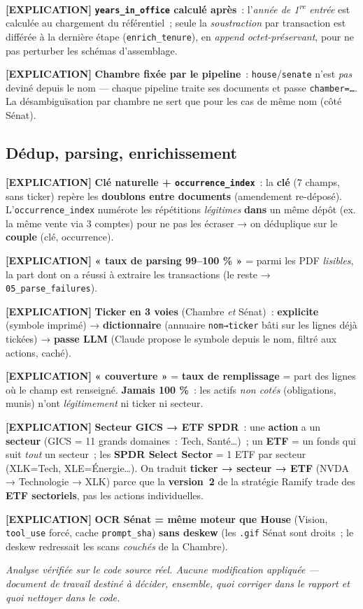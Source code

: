 \documentclass[11pt,a4paper]{article}
\newcommand{\co}[1]{\texttt{\small #1}}
\newcommand{\tagExp}{\textcolor{green!50!black}{\textbf{[EXPLICATION]}}}
\begin{document}
\tagExp{} \textbf{\co{years_in_office} calculé après}~: l'\emph{année de 1\textsuperscript{re} entrée}
est calculée au chargement du référentiel~; seule la \emph{soustraction} par transaction est différée à
la dernière étape (\co{enrich_tenure}), en \emph{append octet-préservant}, pour ne pas perturber les
schémas d'assemblage.

\tagExp{} \textbf{Chambre fixée par le pipeline}~: \co{house}/\co{senate} n'est \emph{pas} deviné depuis
le nom — chaque pipeline traite ses documents et passe \co{chamber=…}. La désambiguïsation par chambre
ne sert que pour les cas de même nom (côté Sénat).

\subsection{Dédup, parsing, enrichissement}
\tagExp{} \textbf{Clé naturelle + \co{occurrence_index}}~: la \textbf{clé} (7 champs, sans ticker) repère
les \textbf{doublons entre documents} (amendement re-déposé). L'\co{occurrence_index} numérote les
répétitions \emph{légitimes} \textbf{dans} un même dépôt (ex. la même vente via 3 comptes) pour ne pas
les écraser → on déduplique sur le \textbf{couple} (clé, occurrence).

\tagExp{} \textbf{« taux de parsing 99–100 \% »} = parmi les PDF \emph{lisibles}, la part dont on a
réussi à extraire les transactions (le reste → \co{05_parse_failures}).

\tagExp{} \textbf{Ticker en 3 voies} (Chambre \emph{et} Sénat)~: \textbf{explicite} (symbole imprimé) →
\textbf{dictionnaire} (annuaire \co{nom→ticker} bâti sur les lignes déjà tickées) → \textbf{passe LLM}
(Claude propose le symbole depuis le nom, filtré aux actions, caché).

\tagExp{} \textbf{« couverture »} = \textbf{taux de remplissage} = part des lignes où le champ est
renseigné. \textbf{Jamais 100 \%}~: les actifs \emph{non cotés} (obligations, munis) n'ont
\emph{légitimement} ni ticker ni secteur.

\tagExp{} \textbf{Secteur GICS → ETF SPDR}~: une \textbf{action} a un \textbf{secteur} (GICS = 11 grands
domaines~: Tech, Santé…)~; un \textbf{ETF} = un fonds qui suit \emph{tout} un secteur~; les \textbf{SPDR
Select Sector} = 1 ETF par secteur (XLK=Tech, XLE=Énergie…). On traduit \textbf{ticker → secteur → ETF}
(NVDA → Technologie → XLK) parce que la \textbf{version~2} de la stratégie Ramify trade des \textbf{ETF
sectoriels}, pas les actions individuelles.

\tagExp{} \textbf{OCR Sénat = même moteur que House} (Vision, \co{tool_use} forcé, cache \co{prompt_sha})
\textbf{sans deskew} (les \co{.gif} Sénat sont droits~; le deskew redressait les scans \emph{couchés} de
la Chambre).

\vfill
\begin{center}\footnotesize\itshape
Analyse vérifiée sur le code source réel. Aucune modification appliquée — document de travail destiné à
décider, ensemble, quoi corriger dans le rapport et quoi nettoyer dans le code.
\end{center}
\end{document}
